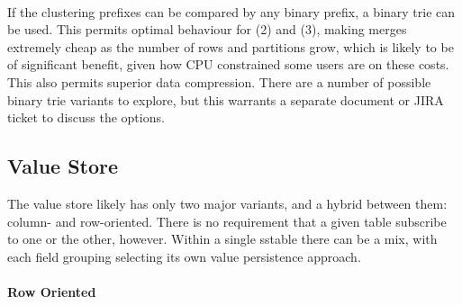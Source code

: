 \documentclass[fleqn]{article}
\begin{document}
\paragraph{}
    If the clustering prefixes can be compared by any binary prefix, a binary trie can be used.
    This permits optimal behaviour for (2) and (3), making merges extremely
    cheap as the number of rows and partitions grow, which is likely to be of significant benefit,
    given how CPU constrained some users are on these costs. This also permits superior
    data compression. There are a number of possible binary trie variants to explore, but this
    warrants a separate document or JIRA ticket to discuss the options.

\subsection{Value Store}
The value store likely has only two major variants, and a hybrid between them: column- and row-oriented.
There is no requirement that a given table subscribe to one or the other, however. Within a single sstable
there can be a mix, with each field grouping selecting its own value persistence approach.
\clearpage
\paragraph{Row Oriented}
\end{document}
